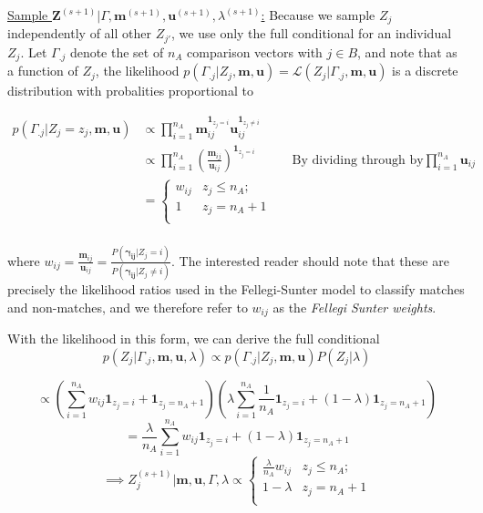 \documentclass[
  12pt,
]{article}
\begin{document}
\underline{Sample $\mathbf{Z}^{(s+1)}|\Gamma, \mathbf{m}^{(s+1)}, \mathbf{u}^{(s+1)}, \lambda^{(s+1)}$:}
Because we sample \(Z_j\) independently of all other \(Z_{j'}\), we use
only the full conditional for an individual \(Z_j\). Let \(\Gamma_{.j}\)
denote the set of \(n_A\) comparison vectors with \(j \in B\), and note
that as a function of \(Z_j\), the likelihood
\(p(\Gamma_{.j}|Z_j, \mathbf{m}, \mathbf{u}) = \mathcal{L}(Z_j|\Gamma_{.j}, \mathbf{m}, \mathbf{u})\)
is a discrete distribution with probalities proportional to

\begin{align*}
p(\Gamma_{.j}|Z_j = z_j, \mathbf{m}, \mathbf{u}) &\propto \prod_{i=1}^{n_A}\mathbf{m}_{ij}^{\mathbf{1}_{z_j = i}}\mathbf{u}_{ij}^{\mathbf{1}_{z_j \neq i}}\\
&\propto \prod_{i=1}^{n_A}\left(\frac{\mathbf{m}_{ij}}{\mathbf{u}_{ij}}\right)^{\mathbf{1}_{z_j = i}} && \text{By dividing through by} \prod_{i = 1}^{n_A}\mathbf{u}_{ij}\\
&=
\begin{cases} 
    w_{ij}  & z_j \leq n_A; \\
    1 &  z_j  = n_A + 1 \\
\end{cases}\\
\end{align*}

where
\(w_{ij} = \frac{\mathbf{m}_{ij}}{\mathbf{u}_{ij}} = \frac{P(\boldsymbol{\gamma_{ij}}|Z_j = i)}{P(\boldsymbol{\gamma_{ij}} |Z_j \neq i)}\).
The interested reader should note that these are precisely the
likelihood ratios used in the Fellegi-Sunter model to classify matches
and non-matches, and we therefore refer to \(w_{ij}\) as the
\emph{Fellegi Sunter weights}.

With the likelihood in this form, we can derive the full conditional
\[p(Z_j|\Gamma_{.j}, \mathbf{m} ,\mathbf{u}, \lambda) \propto p(\Gamma_{.j}| Z_j, \mathbf{m} ,\mathbf{u}) P(Z_j|\lambda)\]

\[\propto \left(\sum_{i=1}^{n_A}w_{ij}\mathbf{1}_{z_j = i} + \mathbf{1}_{z_j = n_A + 1}\right)\left(\lambda\sum_{i=1}^{n_A}\frac{1}{n_A}\mathbf{1}_{z_j = i} + (1-\lambda)\mathbf{1}_{z_j = n_A + 1}\right)\]
\[= \frac{\lambda}{n_A}\sum_{i=1}^{n_A}w_{ij}\mathbf{1}_{z_j = i} + (1-\lambda)\mathbf{1}_{z_j = n_A + 1} \]
\[ \implies Z_j^{(s+1)} | \mathbf{m}, \mathbf{u}, \Gamma, \lambda \propto
\begin{cases} 
    \frac{\lambda}{n_A}w_{ij}   & z_j \leq n_A; \\
     1-\lambda &  z_j  = n_A + 1 \\
\end{cases}\]
\end{document}

